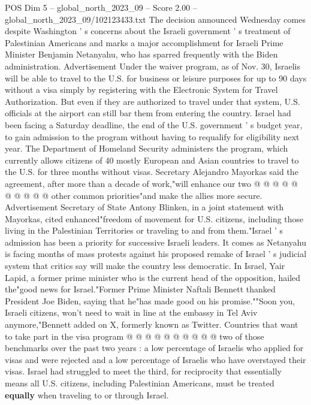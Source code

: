 \begin{textsample}{POS Dim 5 – global\_north\_2023\_09 – Score 2.00 – global\_north\_2023\_09/102123433.txt}  \label{ex:f5_pos_439}
The decision announced Wednesday comes despite Washington ' s concerns about the Israeli government ' s treatment of Palestinian Americans and marks a major accomplishment for Israeli Prime Minister Benjamin Netanyahu, who has sparred frequently with the Biden administration.
Advertisement Under the waiver program, as of Nov. 30, Israelis will be able to travel to the U.S. for business or leisure purposes for up to 90 days without a visa simply by registering with the Electronic System for Travel Authorization.
But even if they are authorized to travel under that system, U.S. officials at the airport can still bar them from entering the country.
Israel had been facing a Saturday deadline, the end of the U.S. government ' s budget year, to gain admission to the program without having to requalify for eligibility next year.
The Department of Homeland Security administers the program, which currently allows citizens of 40 mostly European and Asian countries to travel to the U.S. for three months without visas.
Secretary Alejandro Mayorkas said the agreement, after more than a decade of work,"will enhance our two @ @ @ @ @ @ @ @ @ @ other common priorities"and make the allies more secure.
Advertisement Secretary of State Antony Blinken, in a joint statement with Mayorkas, cited enhanced"freedom of movement for U.S. citizens, including those living in the Palestinian Territories or traveling to and from them."Israel ' s admission has been a priority for successive Israeli leaders.
It comes as Netanyahu is facing months of mass protests against his proposed remake of Israel ' s judicial system that critics say will make the country less democratic.
In Israel, Yair Lapid, a former prime minister who is the current head of the opposition, hailed the"good news for Israel."Former Prime Minister Naftali Bennett thanked President Joe Biden, saying that he"has made good on his promise.""Soon you, Israeli citizens, won't need to wait in line at the embassy in Tel Aviv anymore,"Bennett added on X, formerly known as Twitter.
Countries that want to take part in the visa program @ @ @ @ @ @ @ @ @ @ two of those benchmarks over the past two years : a low percentage of Israelis who applied for visas and were rejected and a low percentage of Israelis who have overstayed their visas.
Israel had struggled to meet the third, for reciprocity that essentially means all U.S. citizens, including Palestinian Americans, must be treated \textbf{equally} when traveling to or through Israel.

\end{textsample}
